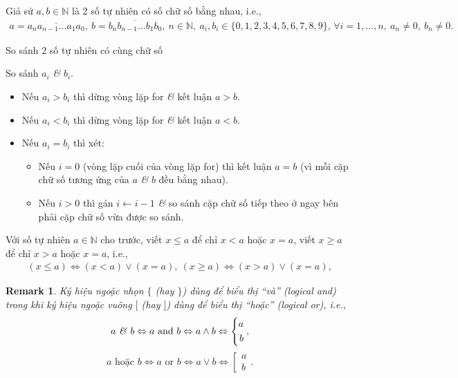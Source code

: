 \documentclass{article}
\numberwithin{equation}{section}
\newtheorem{remark}{Remark}[section]
\begin{document}
Giả sử $a,b\in\mathbb{N}$ là 2 số tự nhiên có số chữ số bằng nhau, i.e.,
\begin{align*}
	a = \overline{a_na_{n-1}\ldots a_1a_0},\ b = \overline{b_nb_{n-1}\ldots b_1b_0},\ n\in\mathbb{N},\ a_i,b_i\in\{0,1,2,3,4,5,6,7,8,9\},\,\forall i = 1,\ldots,n,\ a_n\ne 0,\ b_n\ne 0.
\end{align*}

\begin{algorithm}
	\caption{So sánh 2 số tự nhiên có cùng chữ số}\label{alg:compare naturals with same digits}
	\begin{algorithmic}[1]
		 So sánh $a_i$ \textit{\&} $b_i$.
		\begin{itemize}
			\item Nếu $a_i > b_i$ thì dừng vòng lặp for \textit{\&} kết luận $a > b$.
			\item Nếu $a_i < b_i$ thì dừng vòng lặp for \textit{\&} kết luận $a < b$.
			\item Nếu $a_i = b_i$ thì xét:
			\begin{itemize}
				\item Nếu $i = 0$ (vòng lặp cuối của vòng lặp for) thì kết luận $a = b$ (vì mỗi cặp chữ số tương ứng của $a$ \textit{\&} $b$ đều bằng nhau).
				\item Nếu $i > 0$ thì gán $i\leftarrow i - 1$ \textit{\&} so sánh cặp chữ số tiếp theo ở ngay bên phải cặp chữ số vừa được so sánh.
			\end{itemize}			 
		\end{itemize}		
		\EndFor
	\end{algorithmic}
\end{algorithm}
Với số tự nhiên $a\in\mathbb{N}$ cho trước, viết $x\le a$ để chỉ $x < a$ hoặc $x = a$, viết $x\ge a$ để chỉ $x > a$ hoặc $x = a$, i.e.,
\begin{align*}
	(x\le a)\Leftrightarrow(x < a)\lor(x = a),\ (x\ge a)\Leftrightarrow(x > a)\lor(x = a),
\end{align*}

\begin{remark}
	Ký hiệu ngoặc nhọn $\{$ (hay $\}$) dùng để biểu thị ``và'' (logical and) trong khi ký hiệu ngoặc vuông $[$ (hay $]$) dùng để biểu thị ``hoặc'' (logical or), i.e.,
	\begin{equation*}
		a\mbox{ \textit{\&} } b\Leftrightarrow a\mbox{ and } b\Leftrightarrow a\land b\Leftrightarrow\left\{\begin{split}
			a\\b
		\end{split}\right.,	
	\end{equation*}
	\begin{equation*}
		a\mbox{ hoặc } b\Leftrightarrow a\mbox{ or } b\Leftrightarrow a\lor b\Leftrightarrow\left[\begin{split}
			a\\b
		\end{split}\right..
	\end{equation*}
\end{remark}
\end{document}
